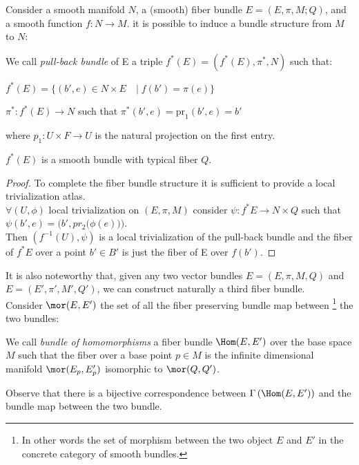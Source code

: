 \documentclass[Main]{subfiles}
\begin{document}
			\vspace{3mm}
			Consider a smooth manifold $N$, a (smooth) fiber bundle $E=(E,\pi,M;Q)$, and a smooth function $f: N \rightarrow M$. it is possible to induce\cite{Husemoller} a bundle structure from $M$ to $N$:
			\begin{definition}
				We call \emph{pull-back bundle} of E a triple $f^* (E) = (f^* (E) , \pi^*,N)$ such that:
				\begin{compactitemize}
					\item $f^* (E) =  \big\{ (b',e) \in N \times E \quad \big\vert \; f(b') = \pi(e) \big\} $
					\item $\pi^*:f^* (E) \rightarrow N $ such that $ \pi^* (b',e) = \textrm{pr}_1 (b',e)= b' $
				\end{compactitemize}
				where $p_1 : U \times F \rightarrow U$ is the natural projection  on the first entry.
			\end{definition}
			\begin{proposition}
				$f^* (E)$ is a smooth bundle with typical fiber $Q$.
			\end{proposition}
			\begin{proof}
				To complete the fiber bundle structure it is sufficient to provide a local trivialization atlas.
				\\
				$\forall ( U, \phi)$ local trivialization on $(E, \pi, M)$  consider $\psi: f^* E \rightarrow N \times Q$ such that $\psi( b',e) = \bigg( b', pr_2 \big( \phi(e)\big)\bigg)$.
				\\
				Then $(f^{-1}(U),\psi)$ is a local trivialization of the pull-back bundle and the fiber of $f^*E$ over a point $b'\in B'$  is just the fiber of E over $f(b')$.
			\end{proof}


			It is also noteworthy that, given any two vector bundles $E =(E,\pi,M,Q)$ and $E =(E',\pi',M',Q')$, we can construct 	naturally a third fiber bundle.\\
			Consider $\mor(E,E')$ the set of all the fiber preserving bundle map between \footnote{In other words the set of morphism between the two object $E$ and $E'$ in the concrete category of smooth bundles.} the two bundles:
			\begin{definition}\label{Def:HomBundle}
				We call \emph{bundle of homomorphisms} a fiber bundle $\Hom(E,E')$ over the base space $M$ such that the fiber over a base point $p\in M$ is the infinite dimensional manifold $\mor(E_p,E'_p)$ isomorphic to $\mor(Q,Q')$.
			\end{definition}
			Observe that there is a bijective correspondence between $\Gamma\left(\Hom(E,E')\right)$ and the bundle map between the two bundle.
			
\end{document}
